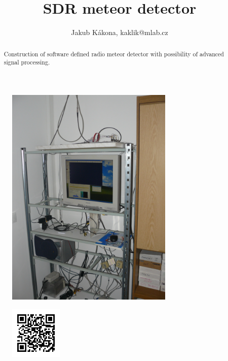 \documentclass[12pt,a4paper,oneside]{article}
\begin{document}
\title{SDR meteor detector}
\author{Jakub Kákona, kaklik@mlab.cz }
\maketitle

\begin{abstract}
Construction of software defined radio meteor detector with possibility of advanced signal processing.
\end{abstract}

\begin{figure} [htbp]
\begin{center}
\includegraphics [width=80mm] {./img/meteor_detector_station.JPG} 
\end{center}
\end{figure}

\begin{figure} [b]
\includegraphics [width=25mm] {./img/SDRX01B_QRcode.png} 
\end{figure}

\newpage
\tableofcontents
\end{document}
